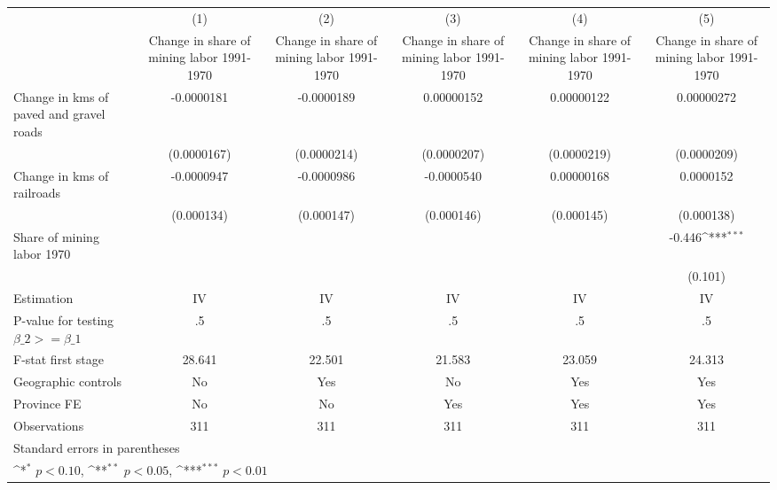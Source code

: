 {
\def\sym#1{\ifmmode^{#1}\else\(^{#1}\)\fi}
\begin{tabular}{l*{5}{c}}
\hline\hline
                    &\multicolumn{1}{c}{(1)}&\multicolumn{1}{c}{(2)}&\multicolumn{1}{c}{(3)}&\multicolumn{1}{c}{(4)}&\multicolumn{1}{c}{(5)}\\
                    &\multicolumn{1}{c}{Change in share of mining labor 1991-1970}&\multicolumn{1}{c}{Change in share of mining labor 1991-1970}&\multicolumn{1}{c}{Change in share of mining labor 1991-1970}&\multicolumn{1}{c}{Change in share of mining labor 1991-1970}&\multicolumn{1}{c}{Change in share of mining labor 1991-1970}\\
\hline
Change in kms of paved and gravel roads&  -0.0000181         &  -0.0000189         &  0.00000152         &  0.00000122         &  0.00000272         \\
                    & (0.0000167)         & (0.0000214)         & (0.0000207)         & (0.0000219)         & (0.0000209)         \\
[1em]
Change in kms of railroads&  -0.0000947         &  -0.0000986         &  -0.0000540         &  0.00000168         &   0.0000152         \\
                    &  (0.000134)         &  (0.000147)         &  (0.000146)         &  (0.000145)         &  (0.000138)         \\
[1em]
Share of mining labor 1970&                     &                     &                     &                     &      -0.446\sym{***}\\
                    &                     &                     &                     &                     &     (0.101)         \\
\hline
Estimation          &          IV         &          IV         &          IV         &          IV         &          IV         \\
P-value for testing $\beta\_2 >= \beta\_1$&          .5         &          .5         &          .5         &          .5         &          .5         \\
F-stat first stage  &      28.641         &      22.501         &      21.583         &      23.059         &      24.313         \\
Geographic controls &          No         &         Yes         &          No         &         Yes         &         Yes         \\
Province FE         &          No         &          No         &         Yes         &         Yes         &         Yes         \\
Observations        &         311         &         311         &         311         &         311         &         311         \\
\hline\hline
\multicolumn{6}{l}{\footnotesize Standard errors in parentheses}\\
\multicolumn{6}{l}{\footnotesize \sym{*} \(p<0.10\), \sym{**} \(p<0.05\), \sym{***} \(p<0.01\)}\\
\end{tabular}
}
